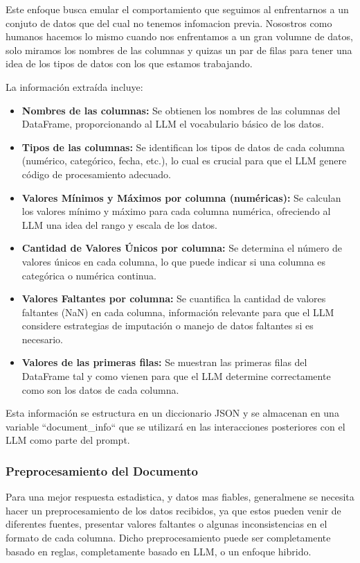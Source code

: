 Este enfoque busca emular el comportamiento que seguimos al enfrentarnos a un conjuto de datos que del cual no tenemos infomacion previa. Nosostros como humanos hacemos lo mismo cuando nos enfrentamos a un gran volumne de datos, solo miramos los nombres de las columnas y quizas un par de filas para tener una idea de los tipos de datos con los que estamos trabajando. 

La información extraída incluye:

\begin{itemize}
	\item \textbf{Nombres de las columnas:}  Se obtienen los nombres de las columnas del DataFrame, proporcionando al LLM el vocabulario básico de los datos.
	\item \textbf{Tipos de las columnas:}  Se identifican los tipos de datos de cada columna (numérico, categórico, fecha, etc.),  lo cual es crucial para que el LLM genere código de procesamiento adecuado.
	\item \textbf{Valores Mínimos y Máximos por columna (numéricas):} Se calculan los valores mínimo y máximo para cada columna numérica, ofreciendo al LLM una idea del rango y escala de los datos.
	\item \textbf{Cantidad de Valores Únicos por columna:} Se determina el número de valores únicos en cada columna, lo que puede indicar si una columna es categórica o numérica continua.
	\item \textbf{Valores Faltantes por columna:} Se cuantifica la cantidad de valores faltantes (NaN) en cada columna, información relevante para que el LLM considere estrategias de imputación o manejo de datos faltantes si es necesario.
	\item \textbf{Valores de las primeras filas:} Se muestran las primeras filas del DataFrame tal y como vienen para que el LLM determine correctamente como son los datos de cada columna.
\end{itemize}
Esta información se estructura en un diccionario JSON y se almacenan en una variable ``document\_info`` que se utilizará en las interacciones posteriores con el LLM como parte del prompt.

\subsubsection{Preprocesamiento del Documento}

Para una mejor respuesta estadistica, y datos mas fiables, generalmene se necesita hacer un preprocesamiento de los datos recibidos, ya que estos pueden venir de diferentes fuentes, presentar valores faltantes o algunas inconsistencias en el formato de cada columna. Dicho preprocesamiento puede ser completamente basado en reglas, completamente basado en LLM, o un enfoque hibrido.

